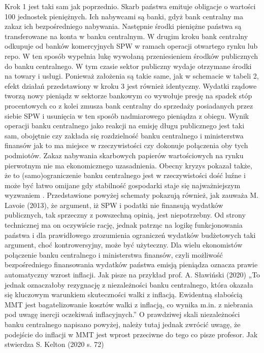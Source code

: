 \documentclass[
]{book}
\begin{document}
Krok 1 jest taki sam jak poprzednio. Skarb państwa emituje obligacje o wartości 100 jednostek pieniężnych. Ich nabywcami są banki, gdyż bank centralny ma zakaz ich bezpośredniego nabywania. Następnie środki pieniężne państwa są transferowane na konta w banku centralnym. W drugim kroku bank centralny odkupuje od banków komercyjnych SPW w ramach operacji otwartego rynku lub repo. W ten sposób wypełnia lukę wywołaną przeniesieniem środków publicznych do banku centralnego. W tym czasie sektor publiczny wydaje otrzymane środki na towary i usługi. Ponieważ założenia są takie same, jak w schemacie w tabeli 2, efekt działań przedstawiony w kroku 3 jest również identyczny. Wydatki rządowe tworzą nowy pieniądz w sektorze bankowym co wywołuje presję na spadek stóp procentowych co z kolei zmusza bank centralny do sprzedaży posiadanych przez siebie SPW i usunięcia w ten sposób nadmiarowego pieniądza z obiegu.
Wynik operacji banku centralnego jako reakcji na emisję długu publicznego jest taki sam, obojętnie czy zakłada się rozdzielność banku centralnego i ministerstwa finansów jak to ma miejsce w rzeczywistości czy dokonuje połączenia oby tych podmiotów. Zakaz nabywania skarbowych papierów wartościowych na rynku pierwotnym nie ma ekonomicznego uzasadnienia. Obecny kryzys pokazał także, że to (samo)ograniczenie banku centralnego jest w rzeczywistości dość luźne i może być łatwo omijane gdy stabilność gospodarki staje się najważniejszym wyzwaniem .
Przedstawione powyżej schematy pokazują również, jak zauważa M. Lavoie (2013), że argument, iż SPW i podatki nie finansują wydatków publicznych, tak sprzeczny z powszechną opinią, jest niepotrzebny. Od strony technicznej ma on oczywiście rację, jednak patrząc na logikę funkcjonowania państwa i dla prawidłowego zrozumienia ograniczeń wydatków budżetowych taki argument, choć kontrowersyjny, może być użyteczny.
Dla wielu ekonomistów połączenie banku centralnego i ministerstwa finansów, czyli możliwość bezpośredniego finansowania wydatków państwa emisją pieniądza oznacza prawie automatyczny wzrost inflacji. Jak pisze na przykład prof. A. Sławiński (2020) „To jednak oznaczałoby rezygnację z niezależności banku centralnego, która okazała się kluczowym warunkiem skuteczności walki z inflacją. Ewidentną słabością MMT jest bagatelizowanie kosztów walki z inflacją, co wynika m.in. z niebrania pod uwagę inercji oczekiwań inflacyjnych.'' O prawdziwej skali niezależności banku centralnego napisano powyżej, należy tutaj jednak zwrócić uwagę, że podejście do inflacji w MMT jest wprost przeciwne do tego co pisze profesor. Jak stwierdza S. Kelton (2020 s. 72)
\end{document}

